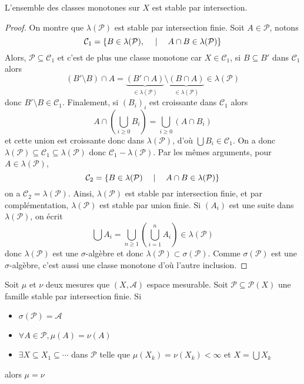 
\begin{rem}
L'ensemble des classes monotones sur $X$ est stable par intersection.
\end{rem}

\begin{proof}
    On montre que $\lambda(\mathcal  P)$ est stable par intersection finie. Soit $A \in  \mathcal  P$, notons \[
        \mathcal  C_1 = \left\{ B \in  \lambda (\mathcal  P), \quad  \suchthat \quad  A\cap B \in  \lambda (\mathcal  P) \right\} 
    \]
    Alors, $\mathcal  P\subseteq \mathcal  C_1$ et c'est de plus une classe monotone car $X \in  \mathcal  C_1$, si $B\subseteq B'$ dans  $\mathcal C_1$ alors \[
        (B' \setminus B)\cap A = \underbrace{(B'\cap A)}_{\in \lambda(\mathcal  P)} \setminus  \underbrace{(B\cap A)}_{\in  \lambda(\mathcal P)} \in \lambda(\mathcal  P)
    \] 
    donc $B' \setminus B \in \mathcal  C_1$. Finalement, si $(B_i)_i$ est croissante dans  $\mathcal  C_1$ alors \[
        A\cap \left( \bigcup_{i\geq 0} B_i \right)= \bigcup_{i\geq 0}(A\cap B_i)
    \] 
    et cette union est croissante donc dans $\lambda(\mathcal  P)$, d'où $\bigcup B_i \in  \mathcal  C_1$. On a donc $\lambda(\mathcal  P)\subseteq \mathcal  C_1\subseteq \lambda(\mathcal  P)$ donc $\mathcal  C_1 - \lambda(\mathcal  P)$. Par les mêmes arguments, pour $A \in  \lambda(\mathcal  P)$, \[
        \mathcal  C_2 = \left\{ B \in  \lambda(\mathcal  P) \quad \suchthat \quad  A\cap B \in  \lambda(\mathcal  P)  \right\} 
    \] 
    on a $\mathcal  C_2=\lambda(\mathcal  P)$. Ainsi, $\lambda(\mathcal  P)$ est stable par intersection finie, et par complémentation, $\lambda(\mathcal  P)$ est stable par union finie. Si  $(A_i)$ est une suite dans  $\lambda(\mathcal  P)$, on écrit \[
        \bigcup A_i=\bigcup_{n\geq 1} \left(\bigcup_{i=1}^nA_i\right) \in \lambda(\mathcal  P)
    \] 
    donc $\lambda(\mathcal  P)$ est une $\sigma$-algèbre et donc  $\lambda(\mathcal  P)\subset \sigma(\mathcal  P)$. Comme $\sigma(\mathcal  P)$ est une $\sigma$-algèbre, c'est aussi une classe monotone d'où l'autre inclusion.
\end{proof}

\begin{cor}
    Soit $\mu$ et  $\nu$ deux mesures que  $(X, \mathcal  A)$ espace mesurable. Soit $\mathcal  P \subseteq \mathcal  P(X)$ une famille stable par intersection finie. Si \begin{itemize}
        \item $\sigma(\mathcal  P)=\mathcal  A$
        \item $\forall  A \in  \mathcal P, \mu(A)=\nu(A)$
        \item $ \exists  X\subseteq X_1\subseteq \cdots $ dans $\mathcal  P$ telle que $\mu(X_k)=\nu(X_k)<\infty$ et  $X=\bigcup X_k$
    \end{itemize}
    alors $\mu=\nu$
\end{cor}

